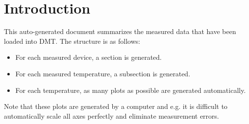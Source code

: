 \documentclass[../documentation.tex]{subfiles}
\begin{document}
\section{Introduction} \label{sec:introduction}
This auto-generated document summarizes the measured data that have been loaded into DMT. The structure is as follows:
\begin{itemize}
    \item For each measured device, a section is generated.
    \item For each measured temperature, a subsection is generated.
    \item For each temperature, as many plots as possible are generated automatically.
\end{itemize}

Note that these plots are generated by a computer and e.g. it is difficult to automatically scale all axes perfectly and eliminate
measurement errors.
\end{document}
